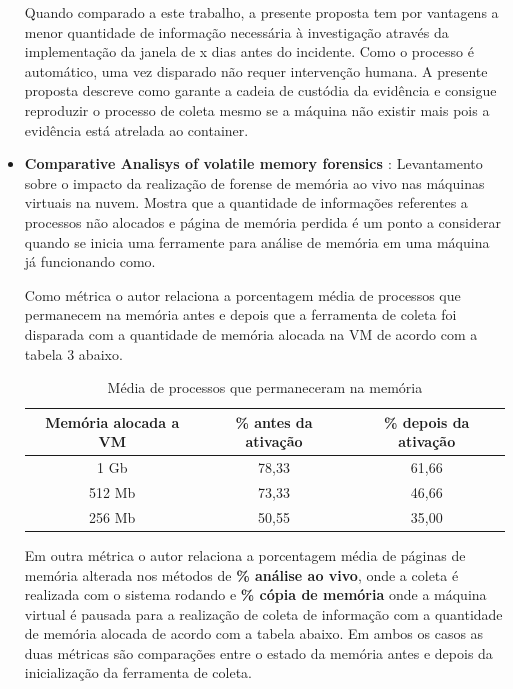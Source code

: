 \documentclass[
	12pt,				%
	openright,			%
	oneside,			%
	a4paper,			%
	english,			%
	french,				%
	spanish,			%
	brazil,				%
	]{abntex2}
\begin{document}
\begin{itemize}
Quando comparado a este trabalho, a presente proposta tem por vantagens a menor quantidade de informação necessária à investigação através da implementação da janela de x
dias antes do incidente. Como o processo é automático, uma vez disparado não requer intervenção humana. A presente proposta descreve como garante a cadeia de custódia da 
evidência e consigue reproduzir o processo de coleta mesmo se a máquina não existir  mais pois a evidência está atrelada ao container. \\

\item \textbf{Comparative Analisys of volatile memory forensics \cite{Aljaedi2011} }: Levantamento sobre o impacto da realização de forense de memória ao vivo nas máquinas
virtuais na nuvem. Mostra que a quantidade de informações referentes a processos não alocados e página de memória perdida é um ponto a considerar quando se inicia uma
ferramente para análise de memória em uma máquina já funcionando como.

Como métrica o autor relaciona a porcentagem média de processos que permanecem na memória antes e depois que a ferramenta de coleta foi disparada com a quantidade de memória
alocada na VM de acordo com a tabela 3 abaixo.

\begin{table}[h!]
\centering
\caption{Média de processos que permaneceram na memória}
\label{my-label}
\begin{tabular}{c|c|c}
\hline
\textbf{Memória alocada a VM} & \textbf{\% antes da ativação} 			  & \textbf{\% depois da ativação} \\ \hline
1 Gb                          & 78,33                                             & 61,66                          \\ \hline
512 Mb                        & 73,33                                             & 46,66                          \\ \hline
256 Mb                        & 50,55                                             & 35,00                                                          
\end{tabular}
\end{table}

Em outra métrica o autor relaciona a porcentagem média de páginas de memória alterada nos métodos de \textbf{\% análise ao vivo}, onde a coleta é realizada com o sistema rodando e 
\textbf{\% cópia de memória} onde a máquina virtual é pausada para a realização de coleta de informação com a quantidade de memória alocada de acordo com a tabela abaixo. Em ambos
os casos as duas métricas são comparações entre o estado da memória antes e depois da inicialização da ferramenta de coleta.


\end{itemize}
\end{document}

